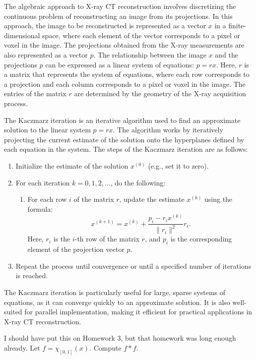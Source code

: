 \begin{solution}
  The algebraic approach to X-ray CT reconstruction involves discretizing the continuous problem of reconstructing an image from its projections. In this approach, the image to be reconstructed is represented as a vector $x$ in a finite-dimensional space, where each element of the vector corresponds to a pixel or voxel in the image. The projections obtained from the X-ray measurements are also represented as a vector $p$. The relationship between the image $x$ and the projections $p$ can be expressed as a linear system of equations: $p = rx$. Here, $r$ is a matrix that represents the system of equations, where each row corresponds to a projection and each column corresponds to a pixel or voxel in the image. The entries of the matrix $r$ are determined by the geometry of the X-ray acquisition process.

  The Kaczmarz iteration is an iterative algorithm used to find an approximate solution to the linear system $p = rx$. The algorithm works by iteratively projecting the current estimate of the solution onto the hyperplanes defined by each equation in the system. The steps of the Kaczmarz iteration are as follows:
  \begin{enumerate}
    \item Initialize the estimate of the solution $x^{(0)}$ (e.g., set it to zero).
    \item For each iteration $k = 0, 1, 2, \ldots$, do the following:
      \begin{enumerate}
        \item For each row $i$ of the matrix $r$, update the estimate $x^{(k)}$ using the formula:
          \[%
            x^{(k+1)} = x^{(k)} + \frac{p_i - r_i x^{(k)}}{\|r_i\|^2} r_i
          .\]%
          Here, $r_i$ is the $i$-th row of the matrix $r$, and $p_i$ is the corresponding element of the projection vector $p$.
      \end{enumerate}
    \item Repeat the process until convergence or until a specified number of iterations is reached.
  \end{enumerate}
  The Kaczmarz iteration is particularly useful for large, sparse systems of equations, as it can converge quickly to an approximate solution. It is also well-suited for parallel implementation, making it efficient for practical applications in X-ray CT reconstruction.
\end{solution}

\begin{problem}[11]
  I should have put this on Homework 3, but that homework was long enough already. Let $f = \chi_{[0, 1]}(x)$. Compute $f * f$.
\end{problem}


